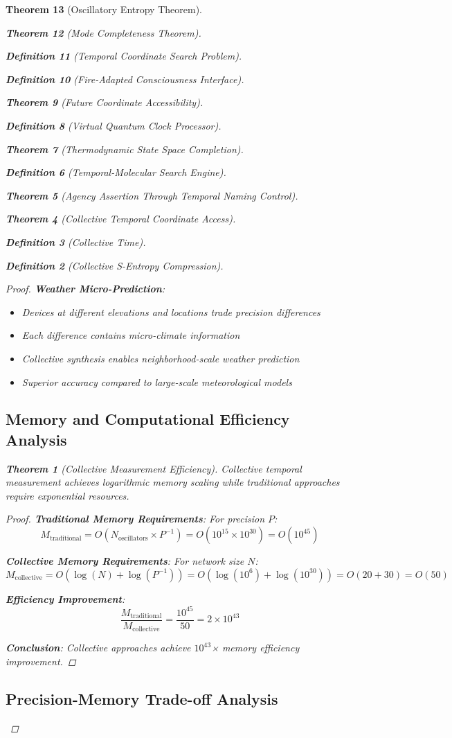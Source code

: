 \documentclass[12pt,a4paper]{article}
\newtheorem{theorem}{Theorem}[section]
\newtheorem{definition}[theorem]{Definition}
\begin{document}
\begin{theorem}[Oscillatory Entropy Theorem]
\begin{theorem}[Mode Completeness Theorem]
\begin{enumerate}
\begin{definition}[Temporal Coordinate Search Problem]
\begin{algorithm}
\begin{definition}[Fire-Adapted Consciousness Interface]
\begin{theorem}[Future Coordinate Accessibility]
\begin{definition}[Virtual Quantum Clock Processor]
\begin{itemize}
\begin{itemize}
\begin{theorem}[Thermodynamic State Space Completion]
\begin{definition}[Temporal-Molecular Search Engine]
\begin{theorem}[Agency Assertion Through Temporal Naming Control]
\begin{remark}
\begin{theorem}[Collective Temporal Coordinate Access]
\begin{definition}[Collective Time]
\begin{definition}[Collective S-Entropy Compression]
\begin{proof}
\textbf{Weather Micro-Prediction}:
\begin{itemize}
\item Devices at different elevations and locations trade precision differences
\item Each difference contains micro-climate information
\item Collective synthesis enables neighborhood-scale weather prediction
\item Superior accuracy compared to large-scale meteorological models
\end{itemize}

\subsection{Memory and Computational Efficiency Analysis}

\begin{theorem}[Collective Measurement Efficiency]
Collective temporal measurement achieves logarithmic memory scaling while traditional approaches require exponential resources.
\end{theorem}

\begin{proof}
\textbf{Traditional Memory Requirements}: For precision $P$:
$$M_{\text{traditional}} = O(N_{\text{oscillators}} \times P^{-1}) = O(10^{15} \times 10^{30}) = O(10^{45})$$

\textbf{Collective Memory Requirements}: For network size $N$:
$$M_{\text{collective}} = O(\log(N) + \log(P^{-1})) = O(\log(10^6) + \log(10^{30})) = O(20 + 30) = O(50)$$

\textbf{Efficiency Improvement}:
$$\frac{M_{\text{traditional}}}{M_{\text{collective}}} = \frac{10^{45}}{50} = 2 \times 10^{43}$$

\textbf{Conclusion}: Collective approaches achieve $10^{43}$× memory efficiency improvement.
\end{proof}

\subsection{Precision-Memory Trade-off Analysis}


\end{proof}
\end{definition}
\end{definition}
\end{theorem}
\end{remark}
\end{theorem}
\end{definition}
\end{theorem}
\end{itemize}
\end{itemize}
\end{definition}
\end{theorem}
\end{definition}
\end{algorithm}
\end{definition}
\end{enumerate}
\end{theorem}
\end{theorem}
\end{document}
